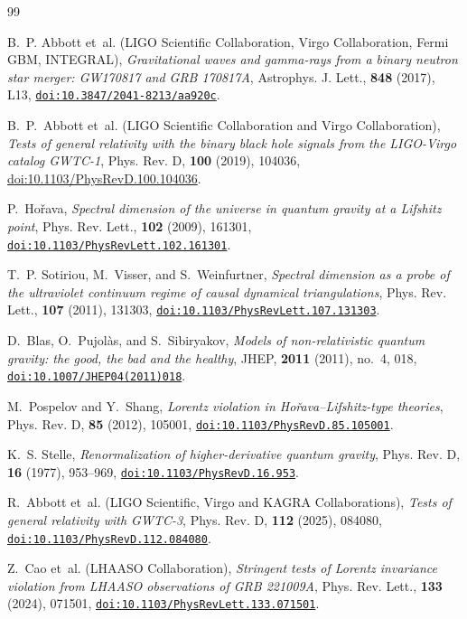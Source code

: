 \documentclass[aps,prl,reprint,twocolumn,superscriptaddress,nofootinbib,floatfix]{revtex4-2}
\providecommand{\doi}[1]{\href{https://doi.org/#1}{\nolinkurl{doi:#1}}}
\begin{document}
\begin{thebibliography}{99}

B.~P. Abbott et~al. (LIGO Scientific Collaboration, Virgo Collaboration, Fermi GBM, INTEGRAL),
\emph{Gravitational waves and gamma-rays from a binary neutron star merger: GW170817 and GRB 170817A},
Astrophys. J. Lett., \textbf{848} (2017), L13,
\doi{10.3847/2041-8213/aa920c}.

B.~P.~Abbott et~al. (LIGO Scientific Collaboration and Virgo Collaboration),
\emph{Tests of general relativity with the binary black hole signals from the LIGO-Virgo catalog GWTC-1},
Phys. Rev. D, \textbf{100} (2019), 104036,
\href{https://doi.org/10.1103/PhysRevD.100.104036}{doi:10.1103/PhysRevD.100.104036}.

P.~Ho\v{r}ava,
\emph{Spectral dimension of the universe in quantum gravity at a Lifshitz point},
Phys. Rev. Lett., \textbf{102} (2009), 161301,
\doi{10.1103/PhysRevLett.102.161301}.

T.~P. Sotiriou, M.~Visser, and S.~Weinfurtner,
\emph{Spectral dimension as a probe of the ultraviolet continuum regime of causal dynamical triangulations},
Phys. Rev. Lett., \textbf{107} (2011), 131303,
\doi{10.1103/PhysRevLett.107.131303}.

D.~Blas, O.~Pujol\`as, and S.~Sibiryakov,
\emph{Models of non-relativistic quantum gravity: the good, the bad and the healthy},
JHEP, \textbf{2011} (2011), no.~4, 018,
\doi{10.1007/JHEP04(2011)018}.

M.~Pospelov and Y.~Shang,
\emph{Lorentz violation in Ho\v{r}ava--Lifshitz-type theories},
Phys. Rev. D, \textbf{85} (2012), 105001,
\doi{10.1103/PhysRevD.85.105001}.

K.~S. Stelle,
\emph{Renormalization of higher-derivative quantum gravity},
Phys. Rev. D, \textbf{16} (1977), 953--969,
\doi{10.1103/PhysRevD.16.953}.

R.~Abbott et~al. (LIGO Scientific, Virgo and KAGRA Collaborations),
\emph{Tests of general relativity with GWTC-3},
Phys. Rev. D, \textbf{112} (2025), 084080,
\doi{10.1103/PhysRevD.112.084080}.

Z.~Cao et~al. (LHAASO Collaboration),
\emph{Stringent tests of Lorentz invariance violation from LHAASO observations of GRB 221009A},
Phys. Rev. Lett., \textbf{133} (2024), 071501,
\doi{10.1103/PhysRevLett.133.071501}.


\end{thebibliography}
\end{document}
